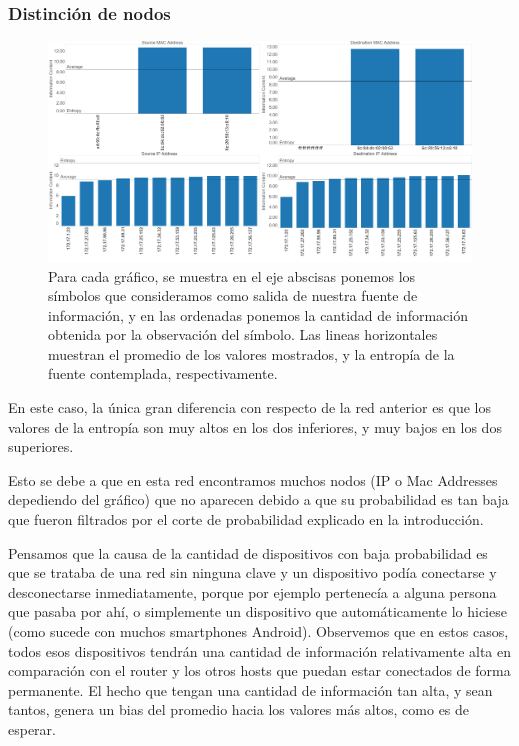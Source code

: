 \documentclass{article}
\theoremstyle{definition}
\theoremstyle{remark}
\begin{document}
\subsubsection{Distinción de nodos}
\begin{figure}[H]
\centering
\includegraphics[width=450pt]{captures/McDonalds/20min/PDFs Dashboard.png}
\caption{Para cada gráfico, se muestra en el eje abscisas ponemos los símbolos que consideramos como salida de nuestra fuente de información, y en las ordenadas ponemos la cantidad de información obtenida por la observación del símbolo. Las lineas horizontales muestran el promedio de los valores mostrados, y la entropía de la fuente contemplada, respectivamente.}
\end{figure}

En este caso, la única gran diferencia con respecto de la red anterior es que los valores de la entropía son muy altos en los dos inferiores, y muy bajos en los dos superiores. 

Esto se debe a que en esta red encontramos muchos nodos (IP o Mac Addresses depediendo del gráfico) que no aparecen debido a que su probabilidad es tan baja que fueron filtrados por el corte de probabilidad explicado en la introducción.

Pensamos que la causa de la cantidad de dispositivos con baja probabilidad es que se trataba de una red sin ninguna clave y un dispositivo podía conectarse y desconectarse inmediatamente, porque por ejemplo pertenecía a alguna persona que pasaba por ahí, o simplemente un dispositivo que automáticamente lo hiciese (como sucede con muchos smartphones Android). Observemos que en estos casos, todos esos dispositivos tendrán una cantidad de información relativamente alta en comparación con el router y los otros hosts que puedan estar conectados de forma permanente. El hecho que tengan una cantidad de información tan alta, y sean tantos, genera un bias del promedio hacia los valores más altos, como es de esperar.
\end{document}

